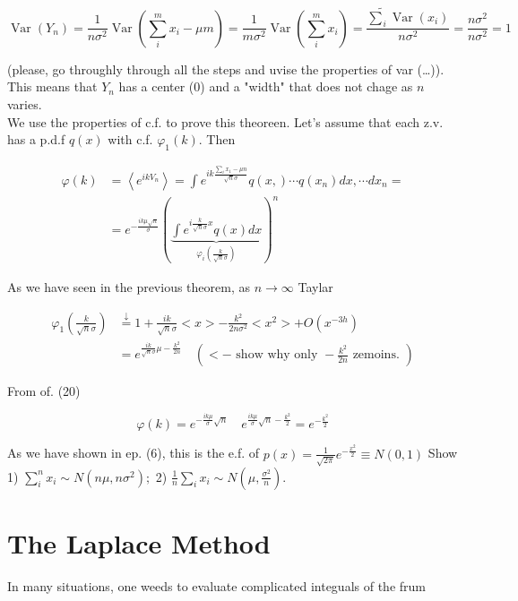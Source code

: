 \documentclass[10pt]{article}
\begin{document}
$$
\operatorname{Var}\left(Y_{n}\right)=\frac{1}{n \sigma^{2}} \operatorname{Var}\left(\sum_{i}^{m} x_{i}-\mu m\right)=\frac{1}{m \sigma^{2}} \operatorname{Var}\left(\sum_{i}^{m} x_{i}\right)=\frac{\tilde{\sum}_{i} \operatorname{Var}\left(x_{i}\right)}{n \sigma^{2}}=\frac{n \sigma^{2}}{n \sigma^{2}}=1
$$

(please, go throughly through all the steps and uvise the properties of var (…)).\\
This means that $Y_{n}$ has a center (0) and a "width" that does not chage as $n$ varies.\\
We use the properties of c.f. to prove this theoreen. Let's assume that each z.v. has a p.d.f $q(x)$ with c.f. $\varphi_{1}(k)$. Then


\begin{align*}
\varphi(k) & =\left\langle e^{i k V_{n}}\right\rangle=\int e^{i k \frac{\sum_{i} x_{1}-\mu n}{\sqrt{n} \sigma}} q(x,) \cdots q\left(x_{n}\right) d x, \cdots d x_{n}= \\
& =e^{-\frac{i k \mu \sqrt{n}}{\sigma}}(\underbrace{\int e^{i \frac{k}{\sqrt{n} \sigma} x} q(x) d x}_{\varphi_{i}\left(\frac{k}{\sqrt{n} \sigma}\right)})^{n} \tag{20}
\end{align*}


As we have seen in the previous theorem, as $n \rightarrow \infty$ Taylar

$$
\begin{aligned}
\varphi_{1}\left(\frac{k}{\sqrt{n} \sigma}\right) & \stackrel{\downarrow}{=} 1+\frac{i k}{\sqrt{n} \sigma}<x>-\frac{k^{2}}{2 n \sigma^{2}}<x^{2}>+O\left(x^{-3 h}\right) \\
& =e^{\frac{i k}{\sqrt{n} \sigma} \mu-\frac{k^{2}}{2 n}} \quad\left(<- \text { show why only }-\frac{k^{2}}{2 n} \text { zemoins. }\right)
\end{aligned}
$$

From of. (20)

$$
\varphi(k)=e^{-\frac{i k \mu}{\sigma} \sqrt{n}} \quad e^{\frac{i k \mu}{\sigma} \sqrt{n}-\frac{k^{2}}{2}}=e^{-\frac{k^{2}}{2}}
$$

As we have shown in ep. (6), this is the e.f. of $p(x)=\frac{1}{\sqrt{2 \pi}} e^{-\frac{x^{2}}{2}} \equiv N(0,1)$ Show 1) $\sum_{i}^{n} x_{i} \sim N\left(n \mu, n \sigma^{2}\right) ;$ 2) $\frac{1}{n} \sum_{i} x_{i} \sim N\left(\mu, \frac{\sigma^{2}}{n}\right)$.

\section*{The Laplace Method}
In many situations, one weeds to evaluate complicated integuals of the frum
\end{document}
